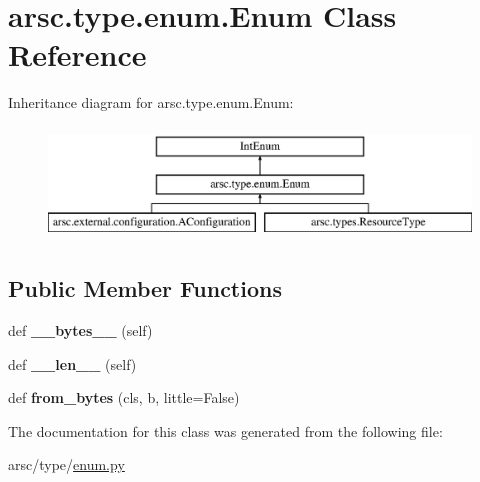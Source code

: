 \hypertarget{classarsc_1_1type_1_1enum_1_1Enum}{}\section{arsc.\+type.\+enum.\+Enum Class Reference}
\label{classarsc_1_1type_1_1enum_1_1Enum}
Inheritance diagram for arsc.\+type.\+enum.\+Enum\+:\begin{figure}[H]
\begin{center}
\leavevmode
\includegraphics[height=3.000000cm]{classarsc_1_1type_1_1enum_1_1Enum}
\end{center}
\end{figure}
\subsection*{Public Member Functions}
\begin{DoxyCompactItemize}
\item 
\mbox{\label{classarsc_1_1type_1_1enum_1_1Enum_a58f05278b7419febc1b4344ca3ec1ef0}} 
def {\bfseries \+\_\+\+\_\+bytes\+\_\+\+\_\+} (self)
\item 
\mbox{\label{classarsc_1_1type_1_1enum_1_1Enum_affa0c921e9b1b2f4b754bd8362d1d106}} 
def {\bfseries \+\_\+\+\_\+len\+\_\+\+\_\+} (self)
\item 
\mbox{\label{classarsc_1_1type_1_1enum_1_1Enum_ac86ef29fae31eb07e6e62ee554f5e8f2}} 
def {\bfseries from\+\_\+bytes} (cls, b, little=False)
\end{DoxyCompactItemize}


The documentation for this class was generated from the following file\+:\begin{DoxyCompactItemize}
\item 
arsc/type/\mbox{\hyperlink{enum_8py}{enum.\+py}}\end{DoxyCompactItemize}
